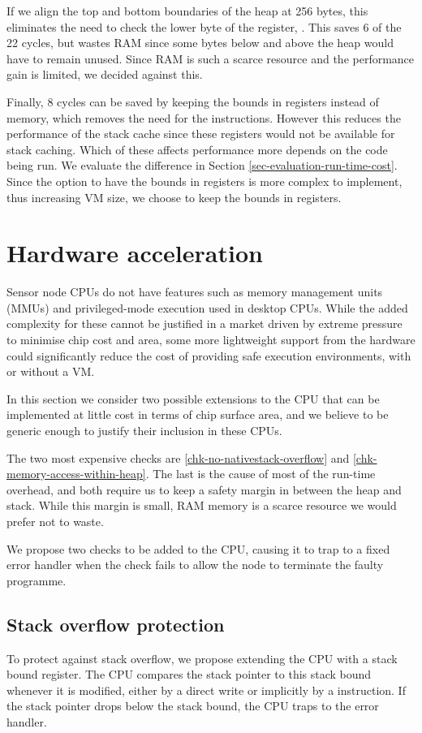 If we align the top and bottom boundaries of the heap at 256 bytes, this eliminates the need to check the lower byte of the  register, . This saves 6 of the 22 cycles, but wastes RAM since some bytes below and above the heap would have to remain unused. Since RAM is such a scarce resource and the performance gain is limited, we decided against this.

Finally, 8 cycles can be saved by keeping the bounds in registers instead of memory, which removes the need for the  instructions. However this reduces the performance of the stack cache since these registers would not be available for stack caching. Which of these affects performance more depends on the code being run. We evaluate the difference in Section \ref{sec-evaluation-run-time-cost}. Since the option to have the bounds in registers is more complex to implement, thus increasing VM size, we choose to keep the bounds in registers.


\section{Hardware acceleration}
Sensor node CPUs do not have features such as memory management units (MMUs) and privileged-mode execution used in desktop CPUs. While the added complexity for these cannot be justified in a market driven by extreme pressure to minimise chip cost and area, some more lightweight support from the hardware could significantly reduce the cost of providing safe execution environments, with or without a VM.

In this section we consider two possible extensions to the CPU that can be implemented at little cost in terms of chip surface area, and we believe to be generic enough to justify their inclusion in these CPUs.

The two most expensive checks are \ref{chk-no-nativestack-overflow} and \ref{chk-memory-access-within-heap}. The last is the cause of most of the run-time overhead, and both require us to keep a safety margin in between the heap and stack. While this margin is small, RAM memory is a scarce resource we would prefer not to waste.

We propose two checks to be added to the CPU, causing it to trap to a fixed error handler when the check fails to allow the node to terminate the faulty programme.

\subsection{Stack overflow protection}
To protect against stack overflow, we propose extending the CPU with a stack bound register. The CPU compares the stack pointer to this stack bound whenever it is modified, either by a direct write or implicitly by a  instruction. If the stack pointer drops below the stack bound, the CPU traps to the error handler.

